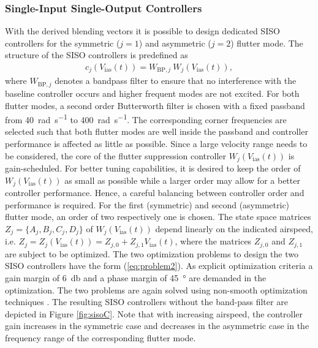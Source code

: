 \documentclass[aerospace,article,submit,moreauthors,pdftex,10pt,a4paper]{Definitions/mdpi}
\begin{document}




\subsubsection{Single-Input Single-Output Controllers}
With the derived blending vectors it is possible to design dedicated SISO controllers for the symmetric ($j=1$) and asymmetric ($j=2$) flutter mode. 
The structure of the \ac{SISO} controllers is predefined as
%
\begin{align}
  c_j (V_{\text{ias}}(t))=W_{\text{BP},j} ~ W_{j}(V_{\text{ias}}(t)),
\end{align}
%
where $W_{\text{BP},j}$ denotes a bandpass filter to ensure that no interference with the baseline controller occurs and higher frequent modes are not excited. For both flutter modes, a second order Butterworth filter is chosen with a fixed passband from \SI{40}{\radian\per\second} to \SI{400}{\radian\per\second}. The corresponding corner frequencies are selected such that both flutter modes are well inside the passband and controller performance is affected as little as possible. 
Since a large velocity range needs to be considered, the core of the flutter suppression controller $W_{j}(V_{\text{ias}}(t))$ is gain-scheduled. For better tuning capabilities, it is desired to keep the order of $W_{j}(V_{\text{ias}}(t))$ as small as possible while a larger order may allow for a better controller performance. Hence, a careful balancing between controller order and performance is required. For the first (symmetric) and second (asymmetric) flutter mode, an order of two respectively one is chosen. 
The state space matrices $Z_j=\{A_j,B_j,C_j,D_j\}$ of $W_{j}(V_{\text{ias}}(t))$ depend linearly on the indicated airspeed, i.e. 
$Z_j=Z_j(V_{\text{ias}}(t)) = Z_{j,0}+Z_{j,1} V_{\text{ias}}(t)$, where the matrices $Z_{j,0}$ and $Z_{j,1}$ are subject to be optimized.
The two optimization problems to design the two SISO controllers have the form (\ref{eq:problem2}). As explicit optimization criteria a gain margin of \SI{6}{\decibel} and a phase margin of \SI{45}{\degree} are demanded in the optimization. The two problems are again solved using non-smooth optimization techniques \cite{Apkarian15}. The resulting \ac{SISO} controllers without the band-pass filter are depicted in Figure \ref{fig:sisoC}. Note that with increasing airspeed, the controller gain increases in the symmetric case and decreases in the asymmetric case in the frequency range of the corresponding flutter mode. 
\end{document}
